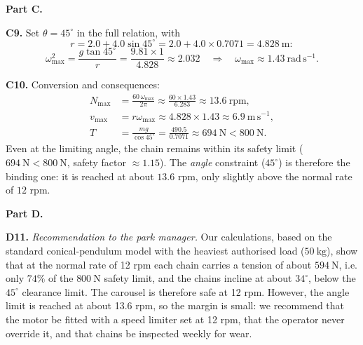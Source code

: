 \documentclass[11pt]{article}
\begin{document}
\textbf{Part C.}

\textbf{C9.} Set $\theta = 45^{\circ}$ in the full relation, with
\[ r = 2.0 + 4.0\sin 45^{\circ} = 2.0 + 4.0 \times 0.7071 = 4.828\ \mathrm{m}: \]
\[ \omega_{\max}^2 = \frac{g\tan 45^{\circ}}{r} = \frac{9.81 \times 1}{4.828} \approx 2.032 \quad\Longrightarrow\quad \omega_{\max} \approx 1.43\ \mathrm{rad\,s^{-1}}. \]

\textbf{C10.} Conversion and consequences:
\begin{align*}
N_{\max} &= \frac{60\,\omega_{\max}}{2\pi} \approx \frac{60 \times 1.43}{6.283} \approx 13.6\ \mathrm{rpm},\\
v_{\max} &= r\omega_{\max} \approx 4.828 \times 1.43 \approx 6.9\ \mathrm{m\,s^{-1}},\\
T &= \frac{mg}{\cos 45^{\circ}} = \frac{490.5}{0.7071} \approx 694\ \mathrm{N} < 800\ \mathrm{N}.
\end{align*}
Even at the limiting angle, the chain remains within its safety limit ($694\ \mathrm{N} < 800\ \mathrm{N}$, safety factor $\approx 1.15$). The \emph{angle} constraint ($45^{\circ}$) is therefore the binding one: it is reached at about $13.6$ rpm, only slightly above the normal rate of $12$ rpm.

\textbf{Part D.}

\textbf{D11.} \emph{Recommendation to the park manager.} Our calculations, based on the standard conical-pendulum model with the heaviest authorised load ($50\ \mathrm{kg}$), show that at the normal rate of 12 rpm each chain carries a tension of about $594\ \mathrm{N}$, i.e. only $74\%$ of the $800\ \mathrm{N}$ safety limit, and the chains incline at about $34^{\circ}$, below the $45^{\circ}$ clearance limit. The carousel is therefore safe at 12 rpm. However, the angle limit is reached at about 13.6 rpm, so the margin is small: we recommend that the motor be fitted with a speed limiter set at 12 rpm, that the operator never override it, and that chains be inspected weekly for wear.
\end{document}
